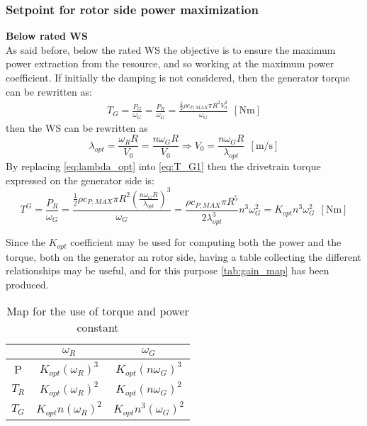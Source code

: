 \subsubsection{Setpoint for rotor side power maximization}\label{subsec:torque_reference}
\textbf{Below rated WS}\label{subsec:below_rotor}\\
As said before, below the rated WS the objective is to ensure the maximum power extraction from the resource, and so working at the maximum power coefficient. If initially the damping is not considered, then the generator torque can be rewritten as:
\begin{gather}
    T_G=\frac{P_G}{\omega_G}=\frac{P_R}{\omega_G}=\frac{\frac{1}{2}\rho c_{P,MAX} \pi R^2 V_0^3}{\omega_G} \ \ \left[\si{\newton\meter}\right]
    \label{eq:T_G1}
\end{gather}
then the \acrshort{WS} can be rewritten as
\begin{equation}
    \lambda_{opt} = \frac{\omega_R R}{V_0} = \frac{n \omega_G R}{V_0} \Rightarrow V_0=\frac{n\omega_G R}{\lambda_{opt}}  \ \ \left[\si{\meter\per\second}\right]
    \label{eq:lambda_opt}
\end{equation}
By replacing \autoref{eq:lambda_opt} into \autoref{eq:T_G1} then the drivetrain torque expressed on the generator side is:
\begin{equation}
    T^G=\frac{P_R}{\omega_G}=\frac{\frac{1}{2}\rho c_{P,MAX} \pi R^2 \left(\frac{n\omega_G R}{\lambda_{opt}}\right)^3}{\omega_G} = \frac{\rho c_{P, MAX} \pi R^5 }{2 \lambda_{opt}^3}n^3\omega_G^{2} = K_{opt}n^3\omega_G^{2}  \ \ \left[\si{\newton\meter}\right]
    \label{eq:T_G2}
\end{equation}

Since the $K_{opt}$ coefficient may be used for computing both the power and the torque, both on the generator an rotor side, having a table collecting the different relationships may be useful, and for this purpose \autoref{tab:gain_map} has been produced.
\begin{table}[htb]
    \centering
    \caption{Map for the use of torque and power constant}
    \begin{tabular}{ccc}
    \toprule
         & $\omega_R$ & $\omega_G$  \\ \midrule
         P & $K_{opt} \left(\omega_{R}\right)^3$ & $K_{opt}\left(n \omega_{G}\right)^3$\\
         $T_R$ & $K_{opt} \left(\omega_{R}\right)^2$ & $K_{opt}\left(n \omega_{G}\right)^2$\\
         $T_G$ & $K_{opt} n \left(\omega_{R}\right)^2$ &  $K_{opt} n^3\left(\omega_{G}\right)^2$\\ \bottomrule
    \end{tabular}
    \label{tab:gain_map}
\end{table}

